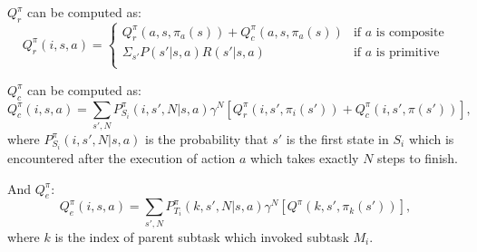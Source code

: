 
$Q_r^{\pi}$ can be computed as:
\begin{equation}
    Q_r^{\pi}(i, s, a) = 
    \left\{\begin{array}{ll}
        Q_r^{\pi}(a, s, \pi_a(s)) + Q_c^{\pi}(a, s, \pi_a(s))& \mbox{if $a$ is composite} \\
        \Sigma_{s'} P(s'|s, a)R(s'|s, a) & \mbox{if $a$ is primitive} \\  
    \end{array} \right.
\end{equation}

$Q_c^{\pi}$ can be computed as:
\begin{equation}
    Q_c^{\pi}(i, s, a) = \sum_{s', N} P_{S_i}^{\pi}(i, s', N|s, a)\gamma^N[Q_r^{\pi}(i, s', \pi_i(s')) + Q_c^{\pi}(i, s', \pi(s'))],
\end{equation}
where $P_{S_i}^{\pi}(i, s', N|s, a)$ is the probability that $s'$ is the first state in $S_i$ which
is encountered after the execution of action $a$ which takes exactly $N$ steps to finish. 

And $Q_e^{\pi}$:
\begin{equation}
    Q_e^{\pi}(i, s, a) = \sum_{s', N} P_{T_i}^{\pi}(k, s', N|s, a)\gamma^N[Q^{\pi}(k, s', \pi_k(s'))],
\end{equation}
where $k$ is the index of parent subtask which invoked subtask $M_i$.


